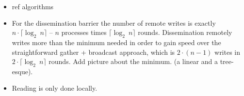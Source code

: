 \documentclass[a4paper, 10pt]{article}
\begin{document}
\begin{itemize}
	\item ref algorithms
	\item For the dissemination barrier the number of remote writes is exactly $n \cdot \lceil \log _2~n \rceil$ -- $n$ processes times $\lceil \log _2~n \rceil$ rounds. Dissemination remotely writes more than the minimum needed in order to gain speed over the straightforward gather + broadcast approach, which is $2 \cdot (n-1)$ writes in $2 \cdot  \lceil \log _2~n \rceil$ rounds. Add picture about the minimum. (a linear and a tree-esque).
	\item Reading is only done locally.



\end{itemize}
\end{document}
